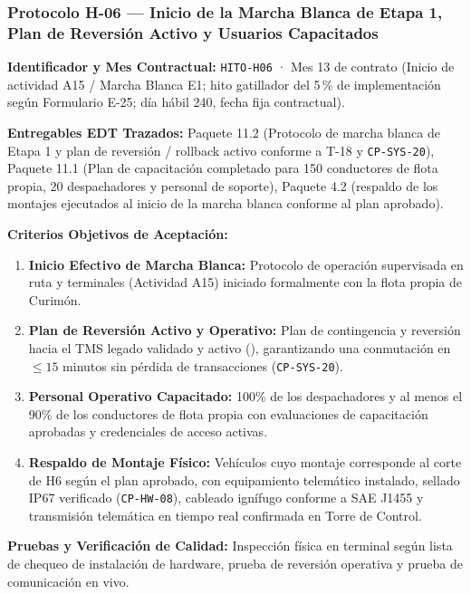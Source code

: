 \subsubsection*{Protocolo H-06 — Inicio de la Marcha Blanca de Etapa 1, Plan de Reversión Activo y Usuarios Capacitados}\label{sec:9-proto-h6}
\par\noindent\textbf{Identificador y Mes Contractual:} \texttt{HITO-H06} · Mes 13 de contrato (Inicio de actividad A15 / Marcha Blanca E1; hito gatillador del 5\,\% de implementación según Formulario E-25; día hábil 240, fecha fija contractual).\par
\par\noindent\textbf{Entregables EDT Trazados:} Paquete 11.2 (Protocolo de marcha blanca de Etapa 1 y plan de reversión / rollback activo conforme a T-18 y \texttt{CP-SYS-20}), Paquete 11.1 (Plan de capacitación completado para 150 conductores de flota propia, 20 despachadores y personal de soporte), Paquete 4.2 (respaldo de los montajes ejecutados al inicio de la marcha blanca conforme al plan aprobado).\par
\par\noindent\textbf{Criterios Objetivos de Aceptación:}
\begin{enumerate}
  \item \textbf{Inicio Efectivo de Marcha Blanca:} Protocolo de operación supervisada en ruta y terminales (Actividad A15) iniciado formalmente con la flota propia de Curimón.
  \item \textbf{Plan de Reversión Activo y Operativo:} Plan de contingencia y reversión hacia el TMS legado validado y activo (), garantizando una conmutación en $\le 15$ minutos sin pérdida de transacciones (\texttt{CP-SYS-20}).
  \item \textbf{Personal Operativo Capacitado:} 100\% de los despachadores y al menos el 90\% de los conductores de flota propia con evaluaciones de capacitación aprobadas y credenciales de acceso activas.
  \item \textbf{Respaldo de Montaje Físico:} Vehículos cuyo montaje corresponde al corte de H6 según el plan aprobado, con equipamiento telemático instalado, sellado IP67 verificado (\texttt{CP-HW-08}), cableado ignífugo conforme a SAE J1455 y transmisión telemática en tiempo real confirmada en Torre de Control.
\end{enumerate}
\par\noindent\textbf{Pruebas y Verificación de Calidad:} Inspección física en terminal según lista de chequeo de instalación de hardware, prueba de reversión operativa y prueba de comunicación en vivo.\par
